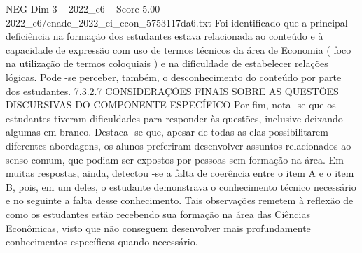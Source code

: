 \begin{textsample}{NEG Dim 3 – 2022\_c6 – Score 5.00 – 2022\_c6/enade\_2022\_ci\_econ\_5753117da6.txt}
Foi identificado que a principal deficiência na formação dos estudantes estava relacionada ao conteúdo e à capacidade de expressão com uso de termos técnicos da área de Economia ( foco na utilização de termos coloquiais ) e na dificuldade de estabelecer relações lógicas.
Pode -se perceber, também, o desconhecimento do conteúdo por parte dos estudantes. 7.3.2.7 CONSIDERAÇÕES FINAIS SOBRE AS QUESTÕES DISCURSIVAS DO COMPONENTE ESPECÍFICO Por fim, nota -se que os estudantes tiveram dificuldades para responder às questões, inclusive deixando algumas em branco.
Destaca -se que, apesar de todas as elas possibilitarem diferentes abordagens, os alunos preferiram desenvolver assuntos relacionados ao senso comum, que podiam ser expostos por pessoas sem formação na área.
Em muitas respostas, ainda, detectou -se a falta de coerência entre o item A e o item B, pois, em um deles, o estudante demonstrava o conhecimento técnico necessário e no seguinte a falta desse conhecimento.
Tais observações remetem à reflexão de como os estudantes estão recebendo sua formação na área das Ciências Econômicas, visto que não conseguem desenvolver mais profundamente conhecimentos específicos quando necessário.

\end{textsample}
